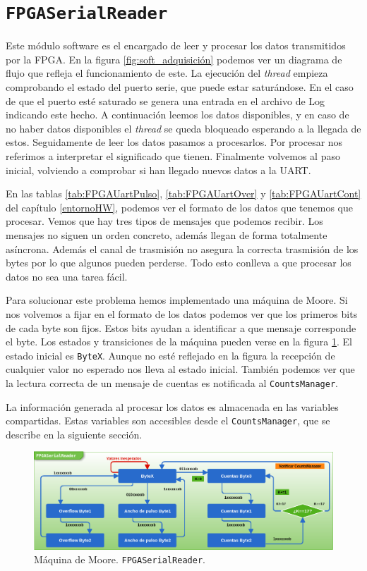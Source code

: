\section{\texttt{FPGASerialReader}}
	Este módulo software es el encargado de leer y procesar los datos transmitidos por la FPGA. En la figura \ref{fig:soft_adquisición} podemos
	ver un diagrama de flujo que refleja el funcionamiento de este. La ejecución del \emph{thread} empieza comprobando el estado del puerto serie,
	que puede estar saturándose. En el caso de que el puerto esté saturado se genera una entrada en el archivo de Log indicando este hecho. A
	continuación leemos los datos disponibles, y en caso de no haber datos disponibles el \emph{thread} se queda bloqueado esperando a la llegada
	de estos. Seguidamente de leer los datos pasamos a procesarlos. Por procesar nos referimos a interpretar el significado que tienen. Finalmente
	volvemos al paso inicial, volviendo a comprobar si han llegado nuevos datos a la UART.
	\par
	En las tablas \ref{tab:FPGAUartPulso}, \ref{tab:FPGAUartOver} y \ref{tab:FPGAUartCont}  del capítulo \ref{entornoHW}, podemos ver el formato
	de los datos que tenemos que procesar. Vemos que hay tres tipos de mensajes que podemos recibir. Los mensajes no siguen un orden concreto,
	además llegan de forma totalmente asíncrona. Además el canal de trasmisión no asegura la correcta trasmisión de los bytes por lo que algunos
	pueden perderse. Todo esto conlleva a que procesar los datos no sea una tarea fácil.
	\par
	Para solucionar este problema hemos implementado una máquina de Moore. Si nos volvemos a fijar en el formato de los datos podemos ver que los
	primeros bits de cada byte son fijos. Estos bits ayudan a identificar a que mensaje corresponde el byte. Los estados y transiciones de la
	máquina pueden verse en la figura \ref{fig:reader}. El estado inicial es \texttt{ByteX}. Aunque no esté reflejado en la figura la recepción de
	cualquier valor no esperado nos lleva al estado inicial. También podemos ver que la lectura correcta de un mensaje de cuentas es notificada al
	\texttt{CountsManager}.
	\par
	La información generada al procesar los datos es almacenada en las variables compartidas. Estas variables son accesibles desde el
	\texttt{CountsManager}, que se describe en la siguiente sección.
	\begin{figure}[h]
		\centering
		\includegraphics[keepaspectratio, width=1\textwidth]{./img/reader.png}
		\caption{Máquina de Moore. \texttt{FPGASerialReader}.}   
		\label{fig:reader}
	\end{figure}

